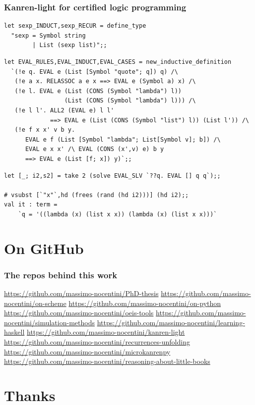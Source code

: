 \documentclass[9pt]{beamer}
\begin{document}
\begin{frame}[fragile]
\frametitle{Kanren-light for certified logic programming}
\begin{verbatim}
let sexp_INDUCT,sexp_RECUR = define_type
  "sexp = Symbol string
        | List (sexp list)";;
\end{verbatim}
\vfill
\begin{verbatim}
let EVAL_RULES,EVAL_INDUCT,EVAL_CASES = new_inductive_definition
  `(!e q. EVAL e (List [Symbol "quote"; q]) q) /\
   (!e a x. RELASSOC a e x ==> EVAL e (Symbol a) x) /\
   (!e l. EVAL e (List (CONS (Symbol "lambda") l))
                 (List (CONS (Symbol "lambda") l))) /\
   (!e l l'. ALL2 (EVAL e) l l'
             ==> EVAL e (List (CONS (Symbol "list") l)) (List l')) /\
   (!e f x x' v b y.
      EVAL e f (List [Symbol "lambda"; List[Symbol v]; b]) /\
      EVAL e x x' /\ EVAL (CONS (x',v) e) b y
      ==> EVAL e (List [f; x]) y)`;;
\end{verbatim}
\vfill
\begin{verbatim}
let [_; i2,s2] = take 2 (solve EVAL_SLV `??q. EVAL [] q q`);;

# vsubst [`"x"`,hd (frees (rand (hd i2)))] (hd i2);;
val it : term = 
    `q = '((lambda (x) (list x x)) (lambda (x) (list x x)))`
\end{verbatim}
\end{frame}

\section{On GitHub}

\begin{frame}[fragile]
\frametitle{The repos behind this work}
\url{https://github.com/massimo-nocentini/PhD-thesis}
\vfill
\url{https://github.com/massimo-nocentini/on-scheme}
\vfill
\url{https://github.com/massimo-nocentini/on-python}
\vfill
\url{https://github.com/massimo-nocentini/oeis-tools}
\vfill
\url{https://github.com/massimo-nocentini/simulation-methods}
\vfill
\url{https://github.com/massimo-nocentini/learning-haskell}
\vfill
\url{https://github.com/massimo-nocentini/kanren-light}
\vfill
\url{https://github.com/massimo-nocentini/recurrences-unfolding}
\vfill
\url{https://github.com/massimo-nocentini/microkanrenpy}
\vfill
\url{https://github.com/massimo-nocentini/reasoning-about-little-books}
\end{frame}

\section{Thanks}

\end{document}
